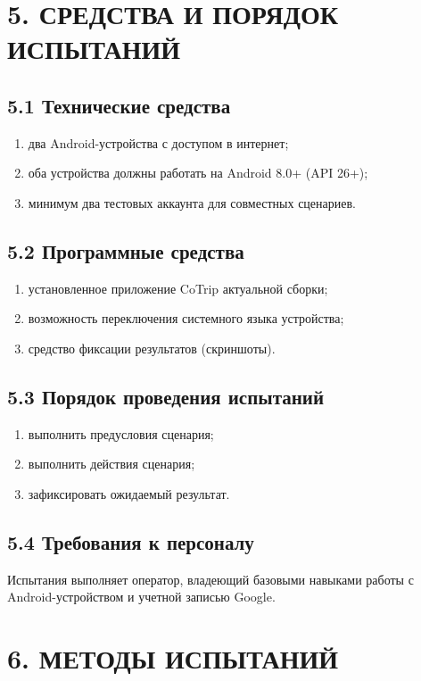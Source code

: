 \documentclass[12pt,a4paper]{article}
\begin{document}
\clearpage
\section*{5. СРЕДСТВА И ПОРЯДОК ИСПЫТАНИЙ}

\subsection*{5.1 Технические средства}
\begin{enumerate}
  \item два Android-устройства с доступом в интернет;
  \item оба устройства должны работать на Android 8.0+ (API 26+);
  \item минимум два тестовых аккаунта для совместных сценариев.
\end{enumerate}

\subsection*{5.2 Программные средства}
\begin{enumerate}
  \item установленное приложение CoTrip актуальной сборки;
  \item возможность переключения системного языка устройства;
  \item средство фиксации результатов (скриншоты).
\end{enumerate}

\subsection*{5.3 Порядок проведения испытаний}
\begin{enumerate}
  \item выполнить предусловия сценария;
  \item выполнить действия сценария;
  \item зафиксировать ожидаемый результат.
\end{enumerate}

\subsection*{5.4 Требования к персоналу}
Испытания выполняет оператор, владеющий базовыми навыками работы с Android-устройством и учетной записью Google.

\clearpage
\section*{6. МЕТОДЫ ИСПЫТАНИЙ}
\setcounter{figure}{0}
\renewcommand{\thefigure}{6.\arabic{figure}}
\end{document}
